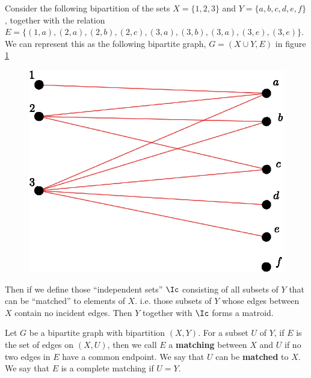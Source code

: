 \begin{example}\label{}
    Consider the following bipartition of the sets $X=\{1,2,3\}$ and
    $Y=\{a,b,c,d,e,f\}$, together with the relation $E=\{(1,a), (2,a), (2,b),
        (2,c), (3,a), (3,b), (3,a), (3,e), (3,e)\}$. We can represent this as
        the following bipartite graph, $G=(X \cup Y, E)$ in figure \ref{fig_1.3}
    \begin{figure}[h]
        \centering
        \includegraphics[scale=0.5]{Figures/chapter1/matching.eps}
        \caption{}
        \label{fig_1.3}
    \end{figure}
    Then if we define those ``independent sets'' $\Ic$ consisting of all subsets
    of  $Y$ that can be ``matched'' to elements of $X$. i.e. those subsets of
    $Y$ whose edges between $X$ contain no incident edges. Then $Y$ together with
    $\Ic$ forms a matroid.
\end{example}

\begin{definition}
    Let $G$ be a bipartite graph with bipartition $(X,Y)$. For a subset $U$  of
    $Y$, if  $E$ is the set of edges on $ (X,U)$, then we call $E$ a
    \textbf{matching} between $X$ and  $U$ if no two edges in  $E$ have a common
    endpoint. We say that $U$ can be \textbf{matched} to $X$. We say that  $E$
    is a complete matching if $U=Y$.
\end{definition}

